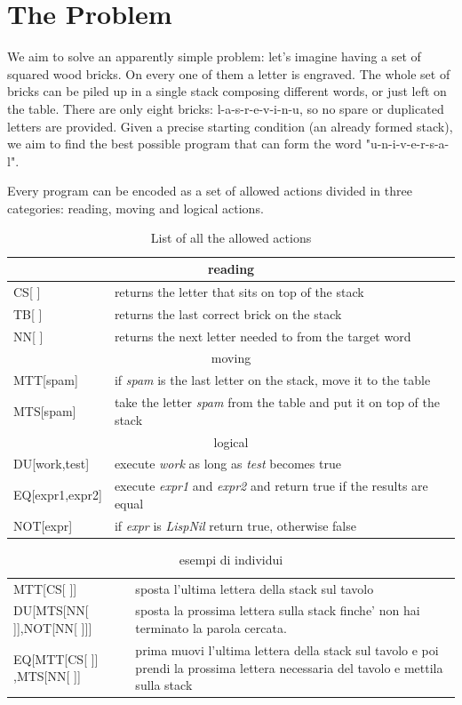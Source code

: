 \documentclass[12pt, a4paper]{article}
\begin{document}
\section{The Problem}
We aim to solve an apparently simple problem:
let's imagine having a set of squared wood bricks. On every one of them a letter is engraved. The whole set of bricks can be piled up in a single stack composing different words, or just left on the table. There are only eight bricks: l-a-s-r-e-v-i-n-u, so no spare or duplicated letters are provided.
Given a precise starting condition (an already formed stack), we aim to find the best possible program that can form the word "u-n-i-v-e-r-s-a-l".

Every program can be encoded as a set of allowed actions divided in three categories: reading, moving and logical actions.


\begin{table}[hbp]
\begin{tabular}[b]{|l|l|}
\hline
\multicolumn{2}{|c|}{reading} \\
\hline
CS[ ] 	& returns the letter that sits on top of the stack \\
TB[ ] 	& returns the last correct brick on the stack \\
NN[ ] 	& returns the next letter needed to from the target word \\
\hline
\multicolumn{2}{|c|}{moving}\\
\hline
MTT[spam]	& if \textit{spam} is the last letter on the stack, move it to the table \\
MTS[spam]	& take the letter \textit{spam} from the table and put it on top of the stack \\
\hline
\multicolumn{2}{|c|}{logical}\\
\hline
DU[work,test]	&	execute \textit{work} as long as \textit{test} becomes true \\
EQ[expr1,expr2] &	execute \textit{expr1} and \textit{expr2} and return true if the results are equal \\
NOT[expr] 		&	if \textit{expr} is \textit{LispNil} return true, otherwise false \\
\hline
\end{tabular}
\caption{List of all the allowed actions}
\label{table:introfun}
\end{table}




\begin{center}
\begin{table}[hbp]
\begin{tabular}[b]{|l|p{7.5cm}|}
\hline
MTT[CS[ ]] & sposta l'ultima lettera della stack sul tavolo\\
DU[MTS[NN[ ]],NOT[NN[ ]]] & sposta la prossima lettera sulla stack finche' non hai terminato la parola cercata.\\
EQ[MTT[CS[ ]] ,MTS[NN[ ]] & prima muovi l'ultima lettera della stack sul tavolo e poi prendi la prossima lettera necessaria del tavolo e mettila sulla stack \\ 
\hline
\end{tabular}
\caption{esempi di individui}
\label{table:esind}
\end{table}
\end{center}
\end{document}

